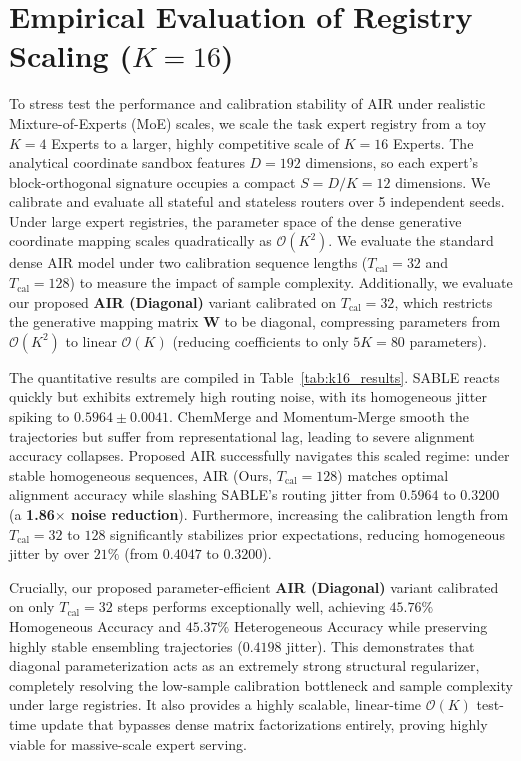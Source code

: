 \documentclass{article}
\theoremstyle{plain}
\theoremstyle{definition}
\theoremstyle{remark}
\begin{document}
\section{Empirical Evaluation of Registry Scaling ($K=16$)}
\label{app:k16_scaling_results}

To stress test the performance and calibration stability of AIR under realistic Mixture-of-Experts (MoE) scales, we scale the task expert registry from a toy $K=4$ Experts to a larger, highly competitive scale of $K=16$ Experts. The analytical coordinate sandbox features $D=192$ dimensions, so each expert's block-orthogonal signature occupies a compact $S = D / K = 12$ dimensions. We calibrate and evaluate all stateful and stateless routers over 5 independent seeds. Under large expert registries, the parameter space of the dense generative coordinate mapping scales quadratically as $\mathcal{O}(K^2)$. We evaluate the standard dense AIR model under two calibration sequence lengths ($T_{\text{cal}} = 32$ and $T_{\text{cal}} = 128$) to measure the impact of sample complexity. Additionally, we evaluate our proposed \textbf{AIR (Diagonal)} variant calibrated on $T_{\text{cal}} = 32$, which restricts the generative mapping matrix $\mathbf{W}$ to be diagonal, compressing parameters from $\mathcal{O}(K^2)$ to linear $\mathcal{O}(K)$ (reducing coefficients to only $5K = 80$ parameters).

The quantitative results are compiled in Table~\ref{tab:k16_results}. SABLE reacts quickly but exhibits extremely high routing noise, with its homogeneous jitter spiking to $0.5964 \pm 0.0041$. ChemMerge and Momentum-Merge smooth the trajectories but suffer from representational lag, leading to severe alignment accuracy collapses. Proposed AIR successfully navigates this scaled regime: under stable homogeneous sequences, AIR (Ours, $T_{\text{cal}}=128$) matches optimal alignment accuracy while slashing SABLE's routing jitter from $0.5964$ to $0.3200$ (a \textbf{1.86$\times$ noise reduction}). Furthermore, increasing the calibration length from $T_{\text{cal}}=32$ to $128$ significantly stabilizes prior expectations, reducing homogeneous jitter by over $21\%$ (from $0.4047$ to $0.3200$). 

Crucially, our proposed parameter-efficient \textbf{AIR (Diagonal)} variant calibrated on only $T_{\text{cal}} = 32$ steps performs exceptionally well, achieving $45.76\%$ Homogeneous Accuracy and $45.37\%$ Heterogeneous Accuracy while preserving highly stable ensembling trajectories ($0.4198$ jitter). This demonstrates that diagonal parameterization acts as an extremely strong structural regularizer, completely resolving the low-sample calibration bottleneck and sample complexity under large registries. It also provides a highly scalable, linear-time $\mathcal{O}(K)$ test-time update that bypasses dense matrix factorizations entirely, proving highly viable for massive-scale expert serving.
\end{document}
